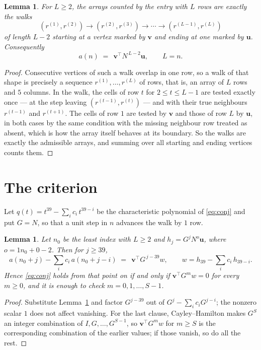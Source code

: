\documentclass[11pt,a4paper]{article}
\theoremstyle{plain}
\newtheorem{lemma}[theorem]{Lemma}
\theoremstyle{definition}
\begin{document}
\begin{lemma}\label{lem:walk}
For $L\ge2$, the arrays counted by the entry with $L$ rows are exactly the walks
\[
(r^{(1)},r^{(2)})\to(r^{(2)},r^{(3)})\to\cdots\to(r^{(L-1)},r^{(L)})
\]
of length $L-2$ starting at a vertex marked by $\mathbf{v}$ and ending at one marked by
$\mathbf{u}$. Consequently
\[
a(n)\;=\;\,\mathbf{v}^{\!\top}N^{\,L-2}\mathbf{u},\qquad L=n .
\]
\end{lemma}

\begin{proof}
Consecutive vertices of such a walk overlap in one row, so a walk of that shape is
precisely a sequence $r^{(1)},\dots,r^{(L)}$ of rows, that is, an array of $L$ rows
and $5$ columns. In the walk, the cells of row $t$ for $2\le t\le L-1$ are tested
exactly once --- at the step leaving $(r^{(t-1)},r^{(t)})$ --- and with their true
neighbours $r^{(t-1)}$ and $r^{(t+1)}$. The cells of row $1$ are tested by
$\mathbf{v}$ and those of row $L$ by $\mathbf{u}$, in both cases by the same condition
with the missing neighbour row treated as absent, which is how the array itself behaves at
its boundary. So the walks are exactly the admissible arrays, and summing over all starting
and ending vertices counts them.
\end{proof}

\section{The criterion}

Let $q(t)=t^{39}-\sum_i c_i\,t^{39-i}$ be the characteristic polynomial of
\eqref{eq:conj} and put $G=N$, so that a unit step in $n$ advances the walk by
$1$ row.

\begin{lemma}\label{lem:crit}
Let $n_0$ be the least index with $L\ge2$ and $h_j=G^{j}N^{o}\mathbf{u}$, where
$o=1n_0+0-2$. Then for $j\ge39$,
\[
a(n_0+j)-\sum_i c_i\,a(n_0+j-i)\;=\;\,\mathbf{v}^{\!\top}G^{\,j-39}w,
\qquad w=h_{39}-\sum_i c_i\,h_{39-i} .
\]
Hence \eqref{eq:conj} holds from that point on if and only if
$\mathbf{v}^{\!\top}G^{m}w=0$ for every $m\ge0$, and it is enough to check
$m=0,1,\dots,S-1$.
\end{lemma}

\begin{proof}
Substitute Lemma~\ref{lem:walk} and factor $G^{j-39}$ out of
$G^{j}-\sum_ic_iG^{j-i}$; the nonzero scalar $1$ does not affect
vanishing. For the last clause, Cayley--Hamilton makes $G^{S}$ an integer combination of
$I,G,\dots,G^{S-1}$, so $\mathbf{v}^{\!\top}G^{m}w$ for $m\ge S$ is the corresponding
combination of the earlier values; if those vanish, so do all the rest.
\end{proof}
\end{document}
